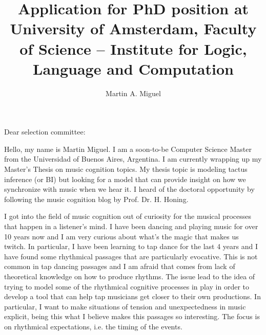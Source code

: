 \documentclass[a4paper]{letter}
\title{Application for PhD position at University of Amsterdam, Faculty of
Science – Institute for Logic, Language and Computation}
\author{Martin A. Miguel}
\begin{document}
\maketitle

\begin{letter}{}

\opening{Dear selection committee:}

Hello, my name is Martin Miguel. I am a soon-to-be Computer Science Master from
the Universidad of Buenos Aires, Argentina. I am currently wrapping up my
Master's Thesis on music cognition topics. My thesis topic is modeling tactus
inference (or BI) but looking for a model that can provide insight on how we
synchronize with music when we hear it. I heard of the doctoral opportunity by
following the music cognition blog by Prof. Dr. H. Honing.

I got into the field of music cognition out of curiosity for the musical
processes that happen in a listener's mind. I have been dancing and playing
music for over 10 years now and I am very curious about what's the magic that
makes us twitch. In particular, I have been learning to tap dance for the last
4 years and I have found some rhythmical passages that are particularly
evocative. This is not common in tap dancing passages and I am afraid that
comes from lack of theoretical knowledge on how to produce rhythms. The issue
lead to the idea of trying to model some of the rhythmical cognitive processes
in play in order to develop a tool that can help tap musicians get closer to
their own productions. In particular, I want to make situations of tension and
unexpectedness in music explicit, being this what I believe makes this passages
so interesting. The focus is on rhythmical expectations, i.e. the timing of the
events.



\end{letter}
\end{document}
